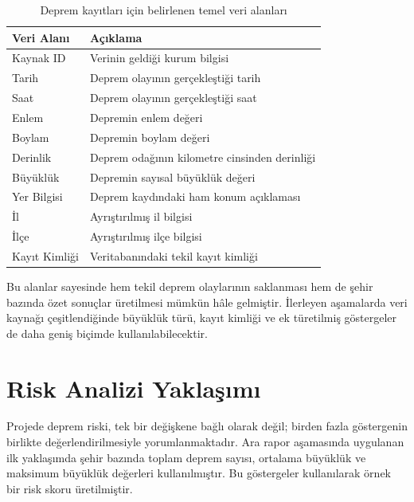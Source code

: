 \documentclass[12pt,a4paper]{report}
\begin{document}
\begin{table}[H]
    \centering
    \caption{Deprem kayıtları için belirlenen temel veri alanları}
    \begin{tabular}{|l|p{8cm}|}
        \hline
        \textbf{Veri Alanı} & \textbf{Açıklama} \\
        \hline
        Kaynak ID & Verinin geldiği kurum bilgisi \\
        \hline
        Tarih & Deprem olayının gerçekleştiği tarih \\
        \hline
        Saat & Deprem olayının gerçekleştiği saat \\
        \hline
        Enlem & Depremin enlem değeri \\
        \hline
        Boylam & Depremin boylam değeri \\
        \hline
        Derinlik & Deprem odağının kilometre cinsinden derinliği \\
        \hline
        Büyüklük & Depremin sayısal büyüklük değeri \\
        \hline
        Yer Bilgisi & Deprem kaydındaki ham konum açıklaması \\
        \hline
        İl & Ayrıştırılmış il bilgisi \\
        \hline
        İlçe & Ayrıştırılmış ilçe bilgisi \\
        \hline
        Kayıt Kimliği & Veritabanındaki tekil kayıt kimliği \\
        \hline
    \end{tabular}
    \label{tab:verialanlari}
\end{table}

Bu alanlar sayesinde hem tekil deprem olaylarının saklanması hem de şehir bazında
özet sonuçlar üretilmesi mümkün hâle gelmiştir. İlerleyen aşamalarda veri kaynağı
çeşitlendiğinde büyüklük türü, kayıt kimliği ve ek türetilmiş göstergeler de daha
geniş biçimde kullanılabilecektir.

\section{Risk Analizi Yaklaşımı}

Projede deprem riski, tek bir değişkene bağlı olarak değil; birden fazla göstergenin
birlikte değerlendirilmesiyle yorumlanmaktadır. Ara rapor aşamasında uygulanan ilk
yaklaşımda şehir bazında toplam deprem sayısı, ortalama büyüklük ve maksimum büyüklük
değerleri kullanılmıştır. Bu göstergeler kullanılarak örnek bir risk skoru üretilmiştir.
\end{document}

